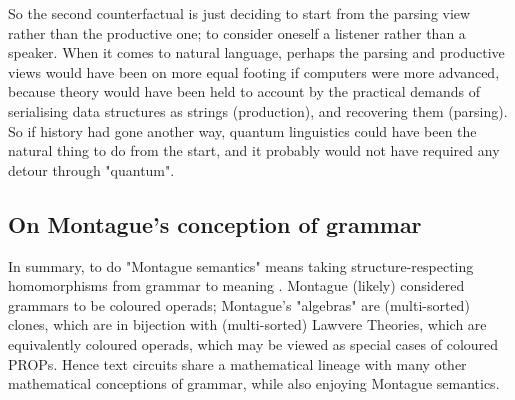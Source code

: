 So the second counterfactual is just deciding to start from the parsing view rather than the productive one; to consider oneself a listener rather than a speaker. When it comes to natural language, perhaps the parsing and productive views would have been on more equal footing if computers were more advanced, because theory would have been held to account by the practical demands of serialising data structures as strings (production), and recovering them (parsing).\\

So if history had gone another way, quantum linguistics could have been the natural thing to do from the start, and it probably would not have required any detour through "quantum".

\subsection{On Montague's conception of grammar}\label{sec:monty}


In summary, to do "Montague semantics" means taking structure-respecting homomorphisms from grammar to meaning \citep{janssenMontagueSemantics2021a}. Montague (likely) considered grammars to be coloured operads; Montague's "algebras" are (multi-sorted) clones, which are in bijection with (multi-sorted) Lawvere Theories, which are equivalently coloured operads, which may be viewed as special cases of coloured PROPs. Hence text circuits share a mathematical lineage with many other mathematical conceptions of grammar, while also enjoying Montague semantics.\\


